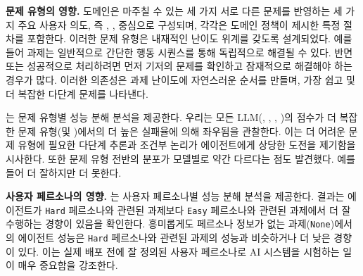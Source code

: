 \textbf{문제 유형의 영향.}
\telecom 도메인은 마주칠 수 있는 세 가지 서로 다른 문제를 반영하는 세 가지 주요 사용자 의도, 즉 \serviceissue, \mobiledataissue,  중심으로 구성되며, 각각은 도메인 정책이 제시한 특정 절차를 포함한다.
이러한 문제 유형은 내재적인 난이도 위계를 갖도록 설계되었다. 예를 들어 \serviceissue 과제는 일반적으로 간단한 행동 시퀀스를 통해 독립적으로 해결될 수 있다. 반면 \mobiledataissue 또는  성공적으로 처리하려면 먼저 기저의 \serviceissue 문제를 확인하고 잠재적으로 해결해야 하는 경우가 많다. 이러한 의존성은 과제 난이도에 자연스러운 순서를 만들며,  가장 쉽고 \mobiledataissue 및  더 복잡한 다단계 문제를 나타낸다.



는 문제 유형별 성능 분해 분석을 제공한다. 우리는 모든 LLM(\gptmodelshort, \ofourmodelshort, \claudesonnetshort, \gptminishort)의 \passk 점수가 더 복잡한 문제 유형(\mobiledataissue 및 \mmsissue)에서의 더 높은 실패율에 의해 좌우됨을 관찰한다. 이는 더 어려운 문제 유형에 필요한 다단계 추론과 조건부 논리가 에이전트에게 상당한 도전을 제기함을 시사한다. 또한 문제 유형 전반의 분포가 모델별로 약간 다르다는 점도 발견했다. 예를 들어    더 잘하지만  더 못한다.



\textbf{사용자 페르소나의 영향.}
는 사용자 페르소나별 성능 분해 분석을 제공한다.
결과는 에이전트가 \texttt{Hard} 페르소나와 관련된 과제보다 \texttt{Easy} 페르소나와 관련된 과제에서 더 잘 수행하는 경향이 있음을 확인한다. 흥미롭게도 페르소나 정보가 없는 과제(\texttt{None})에서의 에이전트 성능은 \texttt{Hard} 페르소나와 관련된 과제의 성능과 비슷하거나 더 낮은 경향이 있다. 이는 실제 배포 전에 잘 정의된 사용자 페르소나로 AI 시스템을 시험하는 일이 매우 중요함을 강조한다.


